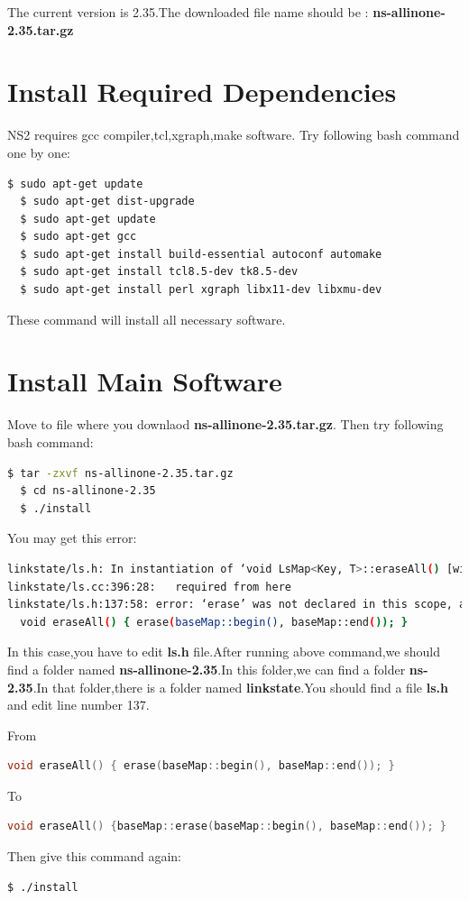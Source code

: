 \documentclass[hidelinks,12pt]{report}
\begin{document}
The current version is 2.35.The downloaded file name should be : \textbf{ns-allinone-2.35.tar.gz}
\section{Install Required Dependencies}
NS2 requires gcc compiler,tcl,xgraph,make software.
Try following bash command one by one:
\begin{lstlisting}[language=bash]
  $ sudo apt-get update
  $ sudo apt-get dist-upgrade
  $ sudo apt-get update
  $ sudo apt-get gcc
  $ sudo apt-get install build-essential autoconf automake
  $ sudo apt-get install tcl8.5-dev tk8.5-dev
  $ sudo apt-get install perl xgraph libx11-dev libxmu-dev
\end{lstlisting}
These command will install all necessary software.
\section{Install Main Software}
Move to file where you downlaod \textbf{ns-allinone-2.35.tar.gz}.
Then try following bash command:
\begin{lstlisting}[language=bash]
  $ tar -zxvf ns-allinone-2.35.tar.gz
  $ cd ns-allinone-2.35
  $ ./install
\end{lstlisting}
You may get this error:
\begin{lstlisting}[language=bash]
linkstate/ls.h: In instantiation of ‘void LsMap<Key, T>::eraseAll() [with Key = int; T = LsIdSeq]’:
linkstate/ls.cc:396:28:   required from here
linkstate/ls.h:137:58: error: ‘erase’ was not declared in this scope, and no declarations were found by argument-dependent lookup at the point of instantiation [-fpermissive]
  void eraseAll() { erase(baseMap::begin(), baseMap::end()); }
\end{lstlisting}
In this case,you have to edit \textbf{ls.h} file.After running above command,we should find a folder named \textbf{ns-allinone-2.35}.In this folder,we can find a folder \textbf{ns-2.35}.In that folder,there is a folder named \textbf{linkstate}.You should find a  file \textbf{ls.h} and edit line number 137.

From 
\begin{lstlisting}[language=c]
  void eraseAll() { erase(baseMap::begin(), baseMap::end()); }
\end{lstlisting}
To
\begin{lstlisting}[language=c]
    void eraseAll() {baseMap::erase(baseMap::begin(), baseMap::end()); }
\end{lstlisting}
Then give this command again:
\begin{lstlisting}[language=bash]
  $ ./install
\end{lstlisting}
\end{document}
